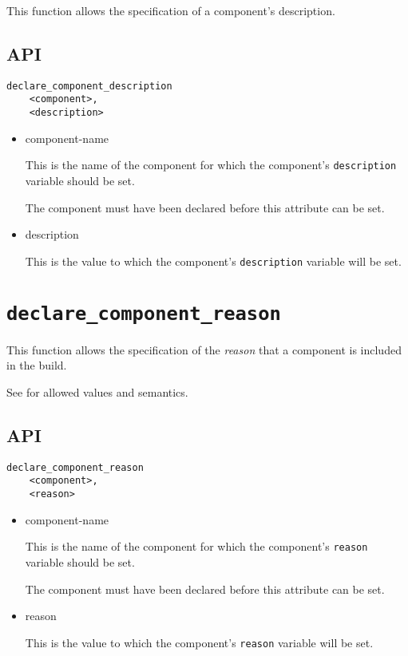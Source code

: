 This function allows the specification of a component's description.

\subsection{API}

\begin{verbatim}
declare_component_description
    <component>,
    <description>
\end{verbatim}

\begin{itemize}
\item component-name

  This is the name of the component for which the component's
  \texttt{description} variable should be set.

  The component must have been declared before this attribute can be
  set.

\item description

  This is the value to which the component's \texttt{description}
  variable will be set.

\end{itemize}

\section{\texttt{declare\_component\_reason}}\label{api:reason}

This function allows the specification of the \emph{reason} that a
component is included in the build.

See  for allowed values and semantics.

\subsection{API}

\begin{verbatim}
declare_component_reason
    <component>,
    <reason>
\end{verbatim}

\begin{itemize}
\item component-name

  This is the name of the component for which the component's
  \texttt{reason} variable should be set.

  The component must have been declared before this attribute can be
  set.

\item reason
  
  This is the value to which the component's \texttt{reason} variable
  will be set.

\end{itemize}

